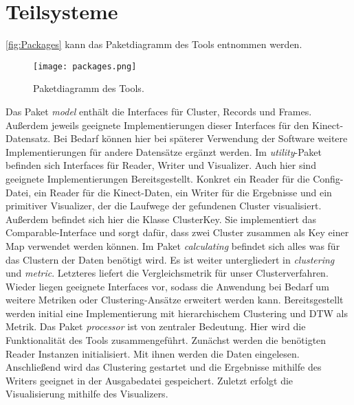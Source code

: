 \section{Teilsysteme}
\label{4-Teilsysteme}
\autoref{fig:Packages} kann das Paketdiagramm des Tools entnommen werden.
\begin{figure}[ht]
    \begin{center}
    \texttt{[image: packages.png]}
    \end{center}
    \caption{Paketdiagramm des Tools.}
    \label{fig:Packages}
\end{figure}
Das Paket \emph{model} enthält die Interfaces für Cluster, Records und Frames.
Außerdem jeweils geeignete Implementierungen dieser Interfaces für den Kinect-Datensatz.
Bei Bedarf können hier bei späterer Verwendung der Software weitere Implementierungen
für andere Datensätze ergänzt werden.
Im \emph{utility}-Paket befinden sich Interfaces für Reader, Writer und Visualizer.
Auch hier sind geeignete Implementierungen Bereitsgestellt.
Konkret ein Reader für die Config-Datei, ein Reader für die Kinect-Daten,
ein Writer für die Ergebnisse und ein primitiver Visualizer,
der die Laufwege der gefundenen Cluster visualisiert.
Außerdem befindet sich hier die Klasse ClusterKey.
Sie implementiert das Comparable-Interface und sorgt dafür,
dass zwei Cluster zusammen als Key einer Map verwendet werden können.
Im Paket \emph{calculating} befindet sich alles was für das Clustern der Daten benötigt wird.
Es ist weiter untergliedert in \emph{clustering} und \emph{metric}.
Letzteres liefert die Vergleichsmetrik für unser Clusterverfahren.
Wieder liegen geeignete Interfaces vor,
sodass die Anwendung bei Bedarf um weitere Metriken oder Clustering-Ansätze erweitert werden kann.
Bereitsgestellt werden initial eine Implementierung mit hierarchischem Clustering
und \ac{DTW} als Metrik.
Das Paket \emph{processor} ist von zentraler Bedeutung.
Hier wird die Funktionalität des Tools zusammengeführt.
Zunächst werden die benötigten Reader Instanzen initialisiert.
Mit ihnen werden die Daten eingelesen.
Anschließend wird das Clustering gestartet und die Ergebnisse mithilfe des Writers
geeignet in der Ausgabedatei gespeichert.
Zuletzt erfolgt die Visualisierung mithilfe des Visualizers.